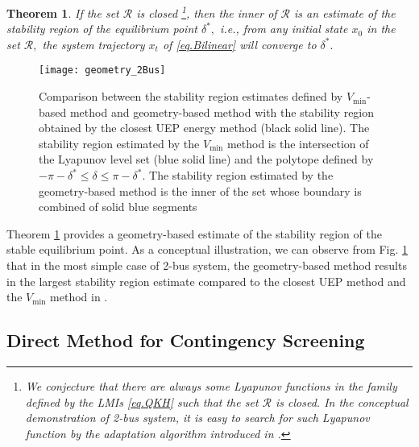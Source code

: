 \documentclass[final]{IEEEtran}
\newtheorem{theorem}{Theorem}\newtheorem{remark}{Remark}\newtheorem{lemma}{Lemma}\usepackage{color}
\begin{document}
\begin{theorem}
\label{thr.stabilityregion}
\emph{If the set $\mathcal{R}$ is closed \footnote{We conjecture that there are always some Lyapunov functions in the family defined by the LMIs \eqref{eq.QKH} such that the set
$\mathcal{R}$ is closed. In the conceptual demonstration of 2-bus system, it is easy to search for such Lyapunov function by the adaptation algorithm introduced in \cite{Vu:2014}.}, then the inner of $\mathcal{R}$ is an estimate of the stability region of the equilibrium point $\delta^*,$ i.e., 
from any initial state $x_0$ in the set $\mathcal{R},$ the system trajectory $x_t$ of \eqref{eq.Bilinear} will converge to  
$\delta^*.$}
\end{theorem}
\begin{figure}
\centering
\texttt{[image: geometry\_2Bus]}
\caption{Comparison between the stability region estimates defined by $V_{\min}$-based method and
geometry-based method with the stability region  obtained
by the closest UEP energy method (black solid line). The stability region estimated by the $V_{\min}$ method is the intersection of the Lyapunov level set (blue 
solid line) and the polytope defined by $-\pi-\delta^* \le \delta
\le \pi-\delta^*.$ The stability region estimated by the geometry-based method is the inner of the set whose boundary is combined of solid blue segments} \label{fig.comparison_2Bus}
\end{figure}


Theorem \ref{thr.stabilityregion} provides a geometry-based estimate of the stability region of the stable equilibrium point. As a conceptual illustration, we can observe from Fig. \ref{fig.comparison_2Bus} that in the most simple case of 2-bus system, the geometry-based method results in the largest stability region estimate compared to the closest UEP method and the $V_{\min}$ method in \cite{Vu:2014}.


\subsection{Direct Method for Contingency Screening}
\end{document}
